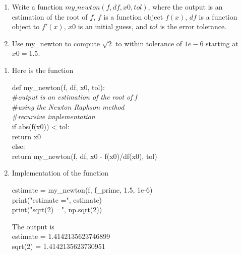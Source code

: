 \begin{example}
\begin{enumerate}[label=(\alph*)]
\item Write a function $my\_newton(f,df,x0,tol)$, where the output is an estimation of the root of $f$, $f$ is a function object $f(x)$, $df$ is a function object to $f'(x)$, $x0$ is an initial guess, and $tol$ is the error tolerance. 
\item Use my\_newton to compute $\sqrt{2}$ to within tolerance of $1e-6$ starting at $x0 = 1.5$.
\end{enumerate}
\end{example}


\begin{mysolution}
\begin{enumerate}[label=(\alph*)]
\item Here is the function
\begin{boxB}
def my\_newton(f, df, x0, tol):\\
\hspace*{1cm}\#{\it output is an estimation of the root of f }\\
\hspace*{1cm}\#{\it using the Newton Raphson method}\\
\hspace*{1cm}\#{\it recursive implementation}\\
\hspace*{1cm}if abs(f(x0)) < tol:\\
\hspace*{1.5cm}return x0\\
\hspace*{1cm}else:\\
\hspace*{1.5cm}return my\_newton(f, df, x0 - f(x0)/df(x0), tol)
\end{boxB}
\item Implementation of the function
\begin{boxB}
estimate = my\_newton(f, f\_prime, 1.5, 1e-6)\\
print("estimate =", estimate)\\
print("sqrt(2) =", np.sqrt(2))
\end{boxB}

The output is\\
estimate = 1.4142135623746899\\
sqrt(2) = 1.4142135623730951
\end{enumerate}

\end{mysolution}


